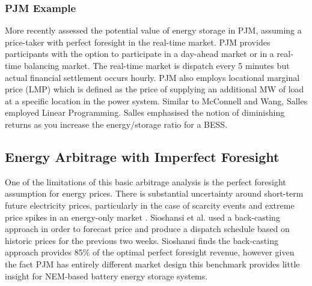 \subsubsection{PJM Example}
More recently \parencite{SallesPJM} assessed the potential value of energy storage in PJM, assuming a price-taker with perfect foresight in the real-time market. PJM provides participants with the option to participate in a day-ahead market or in a real-time balancing market. The real-time market is dispatch every 5 minutes but actual financial settlement occurs hourly. PJM also employs locational marginal price (LMP) which is defined as the price of supplying an additional MW of
load at a specific location in the power system. Similar to McConnell and Wang, Salles employed Linear Programming. Salles emphasised the notion of diminishing returns as you increase the energy/storage ratio for a BESS.
\newpage
\subsection{ Energy Arbitrage with Imperfect Foresight }
One of the limitations of this basic arbitrage analysis is the perfect foresight assumption for energy prices. There is substantial uncertainty around short-term future electricity prices, particularly in the case of scarcity events and extreme price spikes in an energy-only market \parencite{McConnell}. 
Sioshansi et al. used a back-casting approach in order to forecast price and produce a dispatch schedule based on historic prices for the previous two weeks. Sioshansi finds the back-casting approach provides 85\% of the optimal perfect foresight revenue, however given the fact PJM has entirely different market design this benchmark provides little insight for NEM-based battery energy storage systems. 

